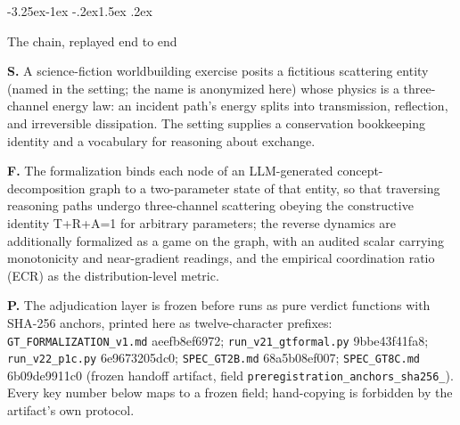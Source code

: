 \documentclass[11pt,a4paper]{article}
\makeatletter
\renewcommand\subsection{\@startsection{subsection}{2}{\z@}%
  {-3.25ex\@plus -1ex \@minus -.2ex}{1.5ex \@plus .2ex}%
  {\normalfont\large\bfseries\raggedright}}
\makeatother
\begin{document}
\subsection{The chain, replayed end to end}

\textbf{S.} A science-fiction worldbuilding exercise posits a fictitious scattering entity (named in the setting; the name is anonymized here) whose physics is a three-channel energy law: an incident path's energy splits into transmission, reflection, and irreversible dissipation. The setting supplies a conservation bookkeeping identity and a vocabulary for reasoning about exchange.

\textbf{F.} The formalization binds each node of an LLM-generated concept-decomposition graph to a two-parameter state of that entity, so that traversing reasoning paths undergo three-channel scattering obeying the constructive identity T+R+A=1 for arbitrary parameters; the reverse dynamics are additionally formalized as a game on the graph, with an audited scalar carrying monotonicity and near-gradient readings, and the empirical coordination ratio (ECR) as the distribution-level metric.

\textbf{P.} The adjudication layer is frozen before runs as pure verdict functions with SHA-256 anchors, printed here as twelve-character prefixes: \texttt{GT\_\allowbreak FORMALIZATION\_\allowbreak v1.md} aeefb8ef6972; \texttt{run\_\allowbreak v21\_\allowbreak gtformal.py} 9bbe43f41fa8; \texttt{run\_\allowbreak v22\_\allowbreak p1c.py} 6e9673205dc0; \texttt{SPEC\_\allowbreak GT2B.md} 68a5b08ef007; \texttt{SPEC\_\allowbreak GT8C.md} 6b09de9911c0 (frozen handoff artifact, field \texttt{preregistration\_\allowbreak anchors\_\allowbreak sha256\_}). Every key number below maps to a frozen field; hand-copying is forbidden by the artifact's own protocol.
\end{document}
